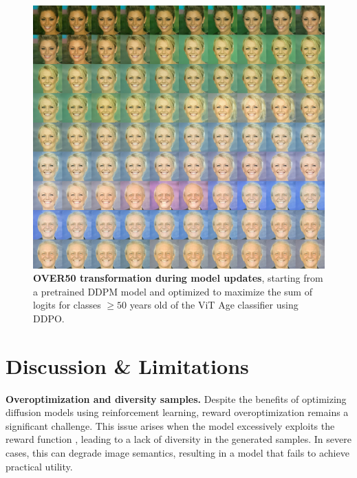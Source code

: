 \begin{figure}[ht]
  \centering
  \includegraphics[scale=2.80]{img/results/over50_47.png}
  \vspace{-0pt}  %
    \captionsetup{width=\textwidth} %
    \caption{\textbf{OVER50 transformation during model updates}, starting from a pretrained DDPM model and optimized to maximize the sum of logits for classes $\geq 50$ years old of the ViT Age classifier using DDPO.}
    \label{fig:ddpm-to-ddpo-over50}
\end{figure}




\section{Discussion \& Limitations}

\noindent\textbf{Overoptimization and diversity samples.} Despite the benefits 
of optimizing diffusion models using reinforcement learning, reward overoptimization remains a significant challenge. This issue arises when the model excessively exploits the reward function \cite{gao2023scaling}, leading to a lack of diversity in the generated samples. In severe cases, this can degrade image semantics, resulting in a model that fails to achieve practical utility. \\

